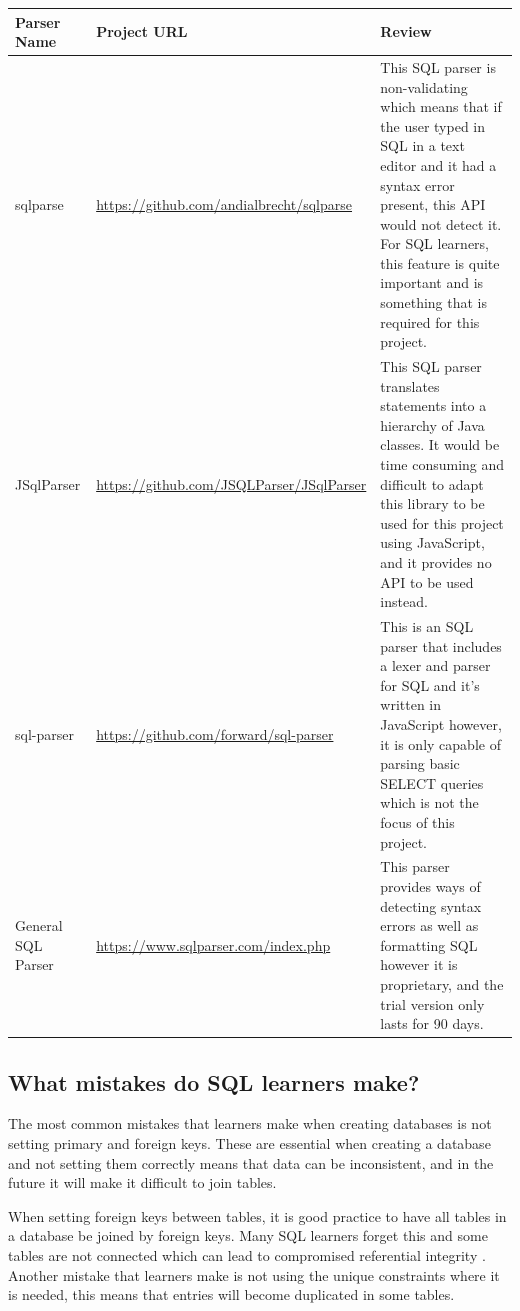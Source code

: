 \begin{center}
	\setlength\extrarowheight{2pt}
	\begin{tabularx}{\textwidth}{|X|X|X|}
		\hline
		\textbf{Parser Name} & \textbf{Project URL} & \textbf{Review} \\
		\hline
		sqlparse & \url{https://github.com/andialbrecht/sqlparse} &  This SQL parser is non-validating which means that if the user typed in SQL in a text editor and it had a syntax error present, this API would not detect it. For SQL learners, this feature is quite important and is something that is required for this project.\\
		\hline
		JSqlParser & \url{https://github.com/JSQLParser/JSqlParser} &  This SQL parser translates statements into a hierarchy of Java classes. It would be time consuming and difficult to adapt this library to be used for this project using JavaScript, and it provides no API to be used instead.\\
		\hline
		sql-parser & \url{https://github.com/forward/sql-parser} & This is an SQL parser that includes a lexer and parser for SQL and it's written in JavaScript however, it is only capable of parsing basic SELECT queries which is not the focus of this project.\\
		\hline
		General SQL Parser & \url{https://www.sqlparser.com/index.php} & This parser provides ways of detecting syntax errors as well as formatting SQL however it is proprietary, and the trial version only lasts for 90 days.\\
		\hline
	\end{tabularx}
	
\end{center}

\subsection{What mistakes do SQL learners make?}

The most common mistakes that learners make when creating databases is not setting primary and foreign keys. These are essential when creating a database and not setting them correctly means that data can be inconsistent, and in the future it will make it difficult to join tables.

When setting foreign keys between tables, it is good practice to have all tables in a database be joined by foreign keys. Many SQL learners forget this and some tables are not connected which can lead to compromised referential integrity \cite{astera}. Another mistake that learners make is not using the unique constraints where it is needed, this means that entries will become duplicated in some tables. 

